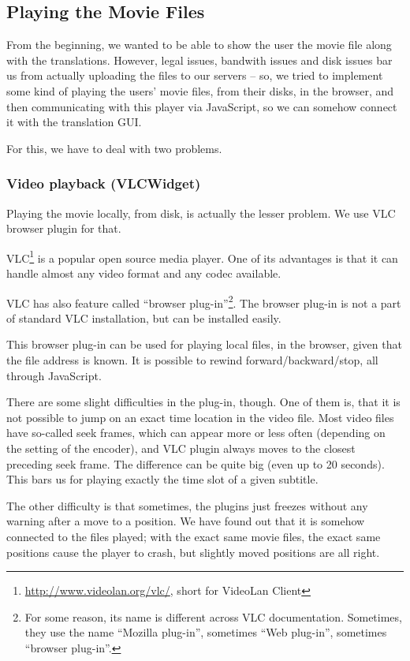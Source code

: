 \subsection{Playing the Movie Files}

From the beginning, we wanted to be able to show the user the movie file along with the translations. However, legal issues, bandwith issues and disk issues bar us from actually uploading the files to our servers -- so, we tried to implement some kind of playing the users' movie files, from their disks, in the browser, and then communicating with this player via JavaScript, so we can somehow connect it with the translation GUI.

For this, we have to deal with two problems.

\subsubsection*{Video playback (VLCWidget)}
Playing the movie locally, from disk, is actually the lesser problem. We use VLC browser plugin for that.

VLC\footnote{\url{http://www.videolan.org/vlc/}, short for VideoLan Client} is a popular open source media player. One of its advantages is that it can handle almost any video format and any codec available.

VLC has also feature called ``browser plug-in''\footnote{For some reason, its name is different across VLC documentation. Sometimes, they use the name ``Mozilla plug-in'', sometimes ``Web plug-in'', sometimes ``browser plug-in''.}. The browser plug-in is not a part of standard VLC installation, but can be installed easily.

This browser plug-in can be used for playing local files, in the browser, given that the file address is known. It is possible to rewind forward/backward/stop, all through JavaScript.

There are some slight difficulties in the plug-in, though. One of them is, that it is not possible to jump on an exact time location in the video file. Most video files have so-called seek frames, which can appear more or less often (depending on the setting of the encoder), and VLC plugin always moves to the closest preceding seek frame. The difference can be quite big (even up to 20 seconds). This bars us for playing exactly the time slot of a given subtitle.

The other difficulty is that sometimes, the plugins just freezes without any warning after a move to a position. We have found out that it is somehow connected to the files played; with the exact same movie files, the exact same positions cause the player to crash, but slightly moved positions are all right.


